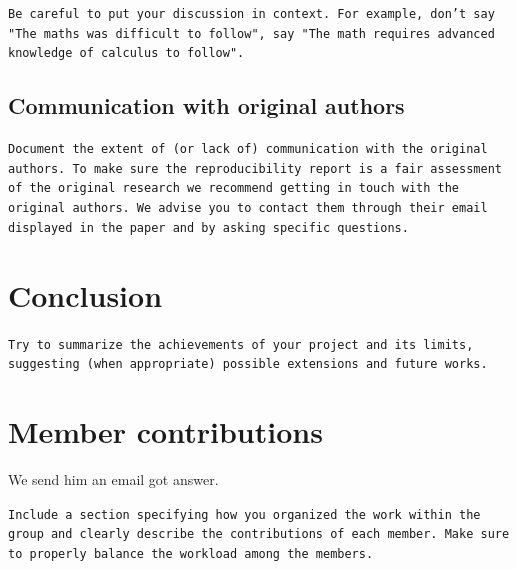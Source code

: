 \documentclass[10pt]{article} %
\begin{document}
\texttt{Be careful to put your discussion in context. For example, don't say "The maths was difficult to follow", say "The math requires advanced knowledge of calculus to follow".}

\subsection{Communication with original authors}
\texttt{Document the extent of (or lack of) communication with the original authors. To make sure the reproducibility report is a fair assessment of the original research we recommend getting in touch with the original authors. We advise you to contact them through their email displayed in the paper and by asking specific questions.}

\section{Conclusion}
\texttt{Try to summarize the achievements of your project and its limits, suggesting (when appropriate) possible extensions and future works.}

\section*{Member contributions}
We send him an email got answer.

\texttt{Include a section specifying how you organized the work within the group and clearly describe the contributions of each member. Make sure to properly balance the workload among the members.}






\end{document}
